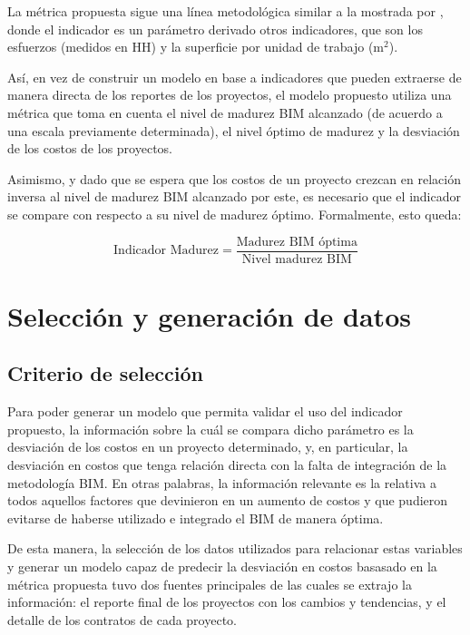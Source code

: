 La métrica propuesta sigue una línea metodológica similar a la mostrada por , donde el indicador es un parámetro derivado otros indicadores, que son los esfuerzos (medidos en HH) y la superficie por unidad de trabajo (m$^2$). 

Así, en vez de construir un modelo en base a indicadores que pueden extraerse de manera directa de los reportes de los proyectos, el modelo propuesto utiliza una métrica que toma en cuenta el nivel de madurez BIM alcanzado (de acuerdo a una escala previamente determinada), el nivel óptimo de madurez y la desviación de los costos de los proyectos.

Asimismo, y dado que se espera que los costos de un proyecto crezcan en relación inversa al nivel de madurez BIM alcanzado por este, es necesario que el indicador se compare con respecto a su nivel de madurez óptimo. Formalmente, esto queda:

\begin{equation}
    \text{Indicador Madurez} = \frac{\text{Madurez BIM óptima}}{\text{Nivel madurez BIM}}
\end{equation}

\section{Selección y generación de datos}

\subsection{Criterio de selección}

Para poder generar un modelo que permita validar el uso del indicador propuesto, la información sobre la cuál se compara dicho parámetro es la desviación de los costos en un proyecto determinado, y, en particular, la desviación en costos que tenga relación directa con la falta de integración de la metodología BIM. En otras palabras, la información relevante es la relativa a todos aquellos factores que devinieron en un aumento de costos y que pudieron evitarse de haberse utilizado e integrado el BIM de manera óptima.

De esta manera, la selección de los datos utilizados para relacionar estas variables y generar un modelo capaz de predecir la desviación en costos basasado en la métrica propuesta tuvo dos fuentes principales de las cuales se extrajo la información: el reporte final de los proyectos con los cambios y tendencias, y el detalle de los contratos de cada proyecto.

